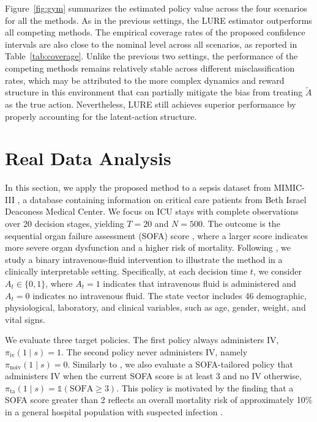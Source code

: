 \documentclass[12pt]{article}
\newcommand{\0}{\boldsymbol{0}}
\begin{document}
Figure~\ref{fig:gym} summarizes the estimated policy value across the four scenarios for all the methods. As in the previous settings, the LURE estimator outperforms all competing methods. The empirical coverage rates of the proposed confidence intervals are also close to the nominal level across all scenarios, as reported in Table~\ref{tab:coverage}. Unlike the previous two settings, the performance of the competing methods remains relatively stable across different misclassification rates, which may be attributed to the more complex dynamics and reward structure in this environment that can partially mitigate the bias from treating $\widetilde A$ as the true action. Nevertheless, LURE still achieves superior performance by properly accounting for the latent-action structure.

\section{Real Data Analysis}\label{sec: real}

In this section, we apply the proposed method to a sepsis dataset from MIMIC-III \citep{johnson2016mimic}, a database containing information on critical care patients from Beth Israel Deaconess Medical Center. We focus on ICU stays with complete observations over 20 decision stages, yielding $T=20$ and $N=500$. The outcome is the sequential organ failure assessment (SOFA) score \citep{jones2009sequential}, where a larger score indicates more severe organ dysfunction and a higher risk of mortality. Following \citet{bian2025off}, we study a binary intravenous-fluid intervention to illustrate the method in a clinically interpretable setting. Specifically, at each decision time $t$, we consider $A_t \in \{0,1\}$, where $A_t=1$ indicates that intravenous fluid is administered and $A_t=0$ indicates no intravenous fluid. The state vector includes 46 demographic, physiological, laboratory, and clinical variables, such as age, gender, weight, and vital signs.

We evaluate three target policies. The first policy always administers IV, $\pi_{\mathrm{iv}}(1\mid s)=1.$ The second policy never administers IV, namely $\pi_{\mathrm{noiv}}(1\mid s)=0.$ Similarly to \citet{bian2025off}, we also evaluate a SOFA-tailored policy that administers IV when the current SOFA score is at least 3 and no IV otherwise, $\pi_{\mathrm{ta}}(1\mid s)=\mathds{1}\left(\mathrm{SOFA}\geq 3\right).$ This policy is motivated by the finding that a SOFA score greater than 2 reflects an overall mortality risk of approximately 10\% in a general hospital population with suspected infection \citep{singer2016third}.
\end{document}
